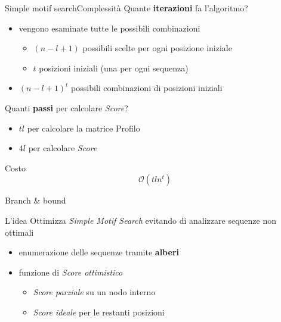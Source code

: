 	\begin{frame}{Simple motif search}{Complessità}
		Quante \alert{\textbf{iterazioni}} fa l'algoritmo?
		\begin{flushleft}
			\begin{itemize}
				\item vengono esaminate tutte le possibili combinazioni
				\begin{itemize}
					\item $(n-l+1)$ possibili scelte per ogni posizione iniziale
					\item $t$ posizioni iniziali (una per ogni sequenza)
				\end{itemize}
				\item $(n-l+1)^t$ possibili combinazioni di posizioni iniziali
			\end{itemize}
		\end{flushleft}
		\begin{flushleft}
			Quanti \alert{\textbf{passi}} per calcolare \textit{Score}?
			\begin{itemize}
				\item $tl$ per calcolare la matrice Profilo
				\item $4l$ per calcolare \textit{Score}
			\end{itemize}
		\end{flushleft}
		\begin{center}
			\begin{minipage}{3cm}
				\begin{block}{Costo}
					$$\mathcal{O}(tln^t)$$
				\end{block}
			\end{minipage}
		\end{center}
	\end{frame}
	
	\begin{frame}{Branch \& bound}
		\begin{block}{L'idea}
			Ottimizza \textit{Simple Motif Search} evitando di analizzare sequenze non ottimali
			\begin{itemize}
				\item enumerazione delle sequenze tramite \alert{\textbf{alberi}}
				\item funzione di \textit{Score ottimistico}
				\begin{itemize}
					\item \textit{Score parziale} su un nodo interno
					\item \textit{Score ideale} per le restanti posizioni
				\end{itemize}
			\end{itemize}
		\end{block}
	\end{frame}
	

